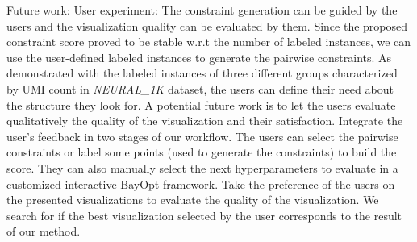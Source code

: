 Future work: User experiment:
The constraint generation can be guided by the users and the visualization quality can be evaluated by them.
Since the proposed constraint score proved to be stable w.r.t the number of labeled instances,
we can use the user-defined labeled instances to generate the pairwise constraints.
As demonstrated with the labeled instances of three different groups characterized by UMI count in \emph{NEURAL\_1K} dataset, the users can define their need about the structure they look for.
A potential future work is to let the users evaluate qualitatively the quality of the visualization and their satisfaction.
Integrate the user's feedback in two stages of our workflow.
The users can select the pairwise constraints or label some points (used to generate the constraints) to build the score.
They can also manually select the next hyperparameters to evaluate in a customized interactive BayOpt framework.
Take the preference of the users on the presented visualizations to evaluate the quality of the visualization. We search for if the best visualization selected by the user corresponds to the result of our method.
